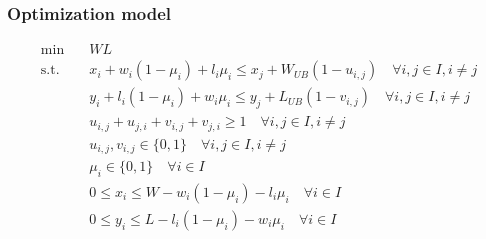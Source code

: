 \documentclass{article}
\begin{document}
\subsubsection*{Optimization model}

\begin{align}
    \min \quad        & WL \label{eq:obj}                                                                                                                     \\
    \text{s.t.} \quad & x_{i} + w_{i} (1-\mu_{i}) + l_{i} \mu_{i} \leq x_{j} + W_{UB} (1 - u_{i, j}) \quad \forall i, j \in I, i \neq j \label{eq:relative_x} \\
                      & y_{i} + l_{i} (1-\mu_{i}) + w_{i} \mu_{i} \leq y_{j} + L_{UB} (1 - v_{i, j}) \quad \forall i, j \in I, i \neq j \label{eq:relative_y} \\
                      & u_{i, j} + u_{j, i} + v_{i, j} + v_{j, i}  \geq 1 \quad \forall i, j \in I, i \neq j \label{eq:non_overlap}                           \\
                      & u_{i, j}, v_{i, j} \in \{0, 1\} \quad \forall i, j \in I, i \neq j                \label{eq:var_uv}                                   \\
                      & \mu_{i} \in \{0, 1\} \quad \forall i \in I                                        \label{eq:var_mu}                                   \\
                      & 0 \leq x_{i} \leq W - w_{i} (1-\mu_{i}) - l_{i} \mu_{i} \quad \forall i \in I      \label{eq:var_x}                                   \\
                      & 0 \leq y_{i} \leq L - l_{i} (1-\mu_{i}) - w_{i} \mu_{i} \quad \forall i \in I       \label{eq:var_y}                                  
\end{align}
\end{document}
